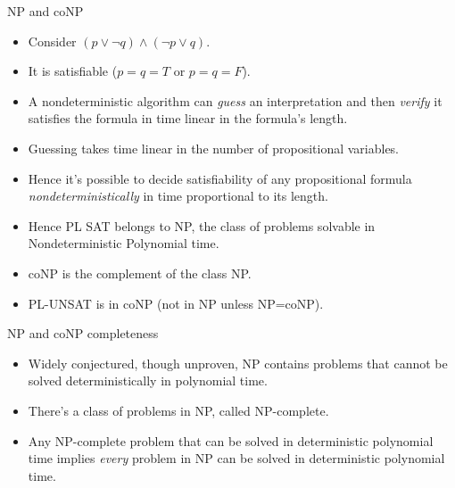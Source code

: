 \documentclass[style=sailor,size=12pt]{powerdot}
\theoremstyle{definition}
\begin{document}
\begin{wideslide}[bm=,toc=]{NP and coNP}
\begin{itemize}
\item Consider $(p\vee\neg q)\wedge(\neg p\vee q)$.
\item It is satisfiable ($p=q=T$ or $p=q=F$).
\item A nondeterministic algorithm can {\em guess\/} an interpretation and then {\em verify\/}
it satisfies the formula in time linear in the formula's length.
\item Guessing takes time linear in the number of propositional variables.
\item Hence it's possible to decide satisfiability of any propositional formula {\em nondeterministically\/}
in time proportional to its length.
\item Hence PL SAT belongs to NP, the class of problems 
solvable in Nondeterministic Polynomial time.
\item coNP is the complement of the class NP.
\item PL-UNSAT is in coNP (not in NP unless NP=coNP).
\end{itemize}
\end{wideslide}


\begin{wideslide}[bm=,toc=]{NP and coNP completeness}
\begin{itemize}
\item Widely conjectured, though unproven, NP contains problems that cannot be solved deterministically
in polynomial time.
\item There's a class of problems in NP, called NP-complete.
\item Any NP-complete problem that can be solved in deterministic polynomial time implies {\em every\/}
problem in NP can be solved in deterministic polynomial time.
\end{itemize}
\end{wideslide}
\end{document}
